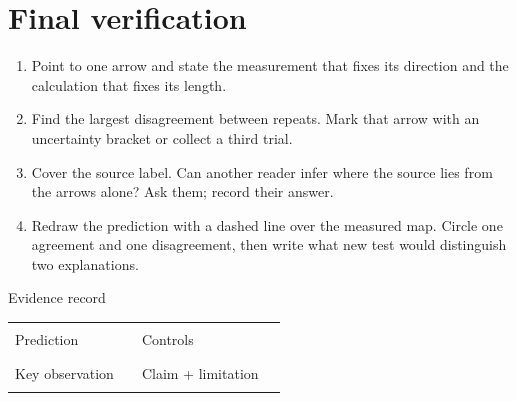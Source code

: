 \section{Final verification}
\begin{enumerate}
\item Point to one arrow and state the measurement that fixes its direction
and the calculation that fixes its length.
\item Find the largest disagreement between repeats. Mark that arrow with an
uncertainty bracket or collect a third trial.
\item Cover the source label. Can another reader infer where the source lies
from the arrows alone? Ask them; record their answer.
\item Redraw the prediction with a dashed line over the measured map. Circle
one agreement and one disagreement, then write what new test would distinguish
two explanations.
\end{enumerate}

\begin{teloscard}{Evidence record}
\footnotesize
\begin{tabularx}{\linewidth}{@{}p{.14\linewidth}Xp{.16\linewidth}X@{}}
Prediction & \rule{\linewidth}{.3pt} &
Controls & \rule{\linewidth}{.3pt}\\[1em]
Key observation & \rule{\linewidth}{.3pt} &
Claim + limitation & \rule{\linewidth}{.3pt}
\end{tabularx}
\end{teloscard}

\sourcefoot

